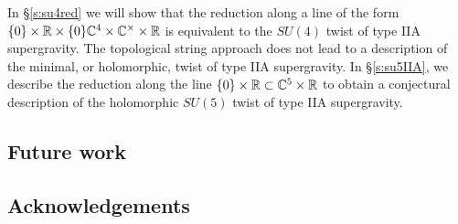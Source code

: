 In \S \ref{s:su4red} we will show that the reduction along a line of the form $\{0\} \times \mathbb R \times \{0\} \mathbb C^4 \times \mathbb C^\times \times \mathbb R$ is equivalent to the $SU(4)$ twist of type IIA supergravity. 
The topological string approach does not lead to a description of the minimal, or holomorphic, twist of type IIA supergravity. 
In \S \ref{s:su5IIA}, we describe the reduction along the line $\{0\} \times \mathbb R \subset \mathbb C^5 \times \mathbb R$ to obtain a conjectural description of the holomorphic $SU(5)$ twist of type IIA supergravity. 


\subsection*{Future work} 

\subsection*{Acknowledgements}


%
